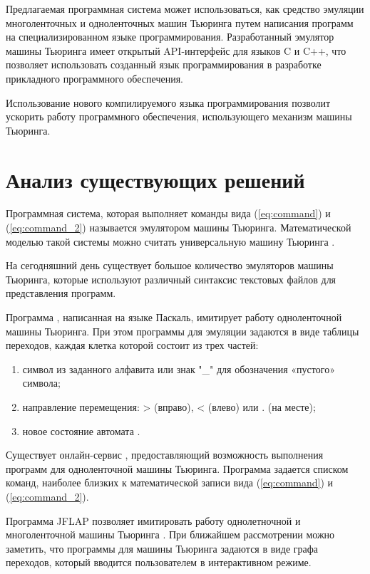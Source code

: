 \documentclass[10pt, normalheadings]{scrartcl}
\begin{document}
\begin{multicols}{2}
Предлагаемая программная система может использоваться, как средство эмуляции многоленточных и одноленточных машин Тьюринга путем написания программ на специализированном языке программирования. Разработанный эмулятор машины Тьюринга имеет открытый API-интерфейс для языков C и C++, что позволяет использовать созданный язык программирования в разработке прикладного программного обеспечения.

Использование нового компилируемого языка программирования позволит ускорить работу программного обеспечения, использующего механизм машины Тьюринга.

\section*{Анализ существующих решений}

Программная система, которая выполняет команды вида (\ref{eq:command}) и (\ref{eq:command_2}) называется эмулятором машины Тьюринга. Математической моделью такой системы можно считать универсальную машину Тьюринга \cite[с.~87]{Guts_Mathem_Logic}.

На сегодняшний день существует большое количество эмуляторов машины Тьюринга, которые используют различный синтаксис текстовых файлов для представления программ.

Программа \cite{Polyakov_Turing}, написанная на языке Паскаль, имитирует работу одноленточной машины Тьюринга. При этом программы для эмуляции задаются в виде таблицы переходов, каждая клетка которой состоит из трех частей:
\begin{enumerate}
	\item символ из заданного алфавита или знак "\_" для обозначения «пустого» символа;
	\item направление перемещения: > (вправо), < (влево) или . (на месте);
	\item новое состояние автомата \cite{Polyakov_Turing}.
\end{enumerate}

Существует онлайн-сервис \cite{Online_Turing}, предоставляющий возможность выполнения программ для одноленточной машины Тьюринга. Программа задается списком команд, наиболее близких к математической записи вида (\ref{eq:command}) и (\ref{eq:command_2}).

Программа JFLAP позволяет имитировать работу однолетночной и многоленточной машины Тьюринга \cite[с.~126]{Rodger_JFLAP}. При ближайшем рассмотрении можно заметить, что программы для машины Тьюринга задаются в виде графа переходов, который вводится пользователем в интерактивном режиме.


\end{multicols}
\end{document}
